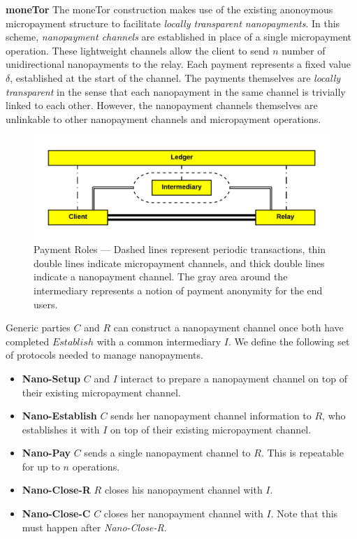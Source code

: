 \textbf{moneTor} The moneTor construction makes use of the existing anonoymous
micropayment structure to facilitate \emph{locally transparent nanopayments}. In
this scheme, \emph{nanopayment channels} are established in place of a single
micropayment operation. These lightweight channels allow the client to send $n$
number of unidirectional nanopayments to the relay. Each payment represents a
fixed value $\delta$, established at the start of the channel. The payments
themselves are \emph{locally transparent} in the sense that each nanopayment in
the same channel is trivially linked to each other. However, the nanopayment
channels themselves are unlinkable to other nanopayment channels and
micropayment operations.
\begin{figure}[h] \centering
  \includegraphics[trim={0.5cm, 0.5cm, 0.5cm, 0.5cm}, clip, scale=0.6]{images/party_diagram.png}
  \caption[Payment Roles]{Payment Roles --- Dashed lines represent periodic
    transactions, thin double lines indicate micropayment channels, and thick
    double lines indicate a nanopayment channel. The gray area around the
    intermediary represents a notion of payment anonymity for the end users.}
  \label{fig:parties}
\end{figure}
Generic parties $C$ and $R$ can construct a nanopayment channel once both have
completed $Establish$ with a common intermediary $I$. We define the following
set of protocols needed to manage nanopayments.

\begin{itemize}
\item \textbf{Nano-Setup} $C$ and $I$ interact to prepare a nanopayment channel on top
  of their existing micropayment channel.
\item \textbf{Nano-Establish} $C$ sends her nanopayment channel information to $R$,
  who establishes it with $I$ on top of their existing micropayment channel.
\item \textbf{Nano-Pay} $C$ sends a single nanopayment channel to $R$. This is
  repeatable for up to $n$ operations.
\item \textbf{Nano-Close-R} $R$ closes his nanopayment channel with $I$.
\item \textbf{Nano-Close-C} $C$ closes her nanopayment channel with $I$. Note that
  this must happen after \emph{Nano-Close-R}.
\end{itemize}

